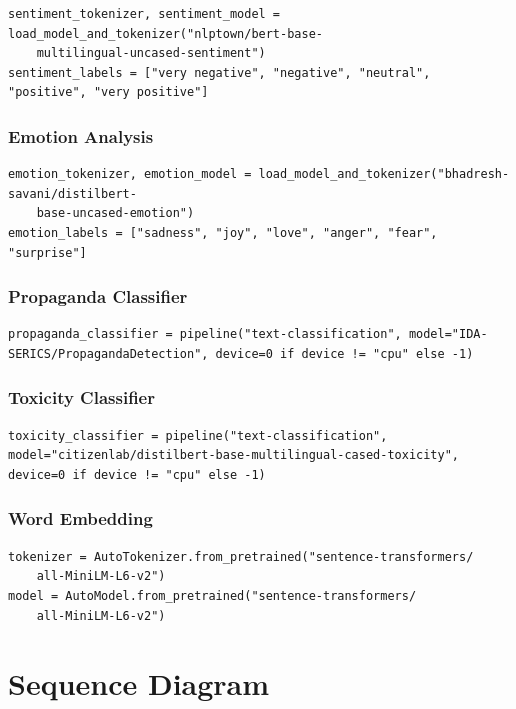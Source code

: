 \documentclass{article}
\begin{document}
\begin{lstlisting}
sentiment_tokenizer, sentiment_model = load_model_and_tokenizer("nlptown/bert-base-
	multilingual-uncased-sentiment")
sentiment_labels = ["very negative", "negative", "neutral", "positive", "very positive"]
\end{lstlisting}

\subsubsection{Emotion Analysis}

\begin{lstlisting}
emotion_tokenizer, emotion_model = load_model_and_tokenizer("bhadresh-savani/distilbert-
	base-uncased-emotion")
emotion_labels = ["sadness", "joy", "love", "anger", "fear", "surprise"]
\end{lstlisting}

\subsubsection{Propaganda Classifier}

\begin{lstlisting}
propaganda_classifier = pipeline("text-classification", model="IDA-SERICS/PropagandaDetection", device=0 if device != "cpu" else -1)
\end{lstlisting}

\subsubsection{Toxicity Classifier}

\begin{lstlisting}
toxicity_classifier = pipeline("text-classification", model="citizenlab/distilbert-base-multilingual-cased-toxicity", device=0 if device != "cpu" else -1)
\end{lstlisting}

\subsubsection{Word Embedding}

\begin{lstlisting}
tokenizer = AutoTokenizer.from_pretrained("sentence-transformers/
	all-MiniLM-L6-v2")
model = AutoModel.from_pretrained("sentence-transformers/
	all-MiniLM-L6-v2")
\end{lstlisting}
\newpage
	\section{Sequence Diagram}
\end{document}
